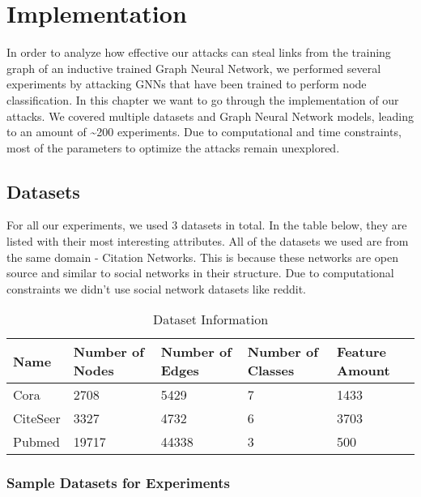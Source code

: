 \chapter{Implementation}

  In order to analyze how effective our attacks can steal links from the training graph of an inductive trained Graph Neural Network, we performed several experiments by attacking GNNs that have been trained to perform node classification.
  In this chapter we want to go through the implementation of our attacks.
  We covered multiple datasets and Graph Neural Network models, leading to an amount of \textasciitilde200 experiments.
  Due to computational and time constraints, most of the parameters to optimize the attacks remain unexplored.

  \section{Datasets}
  \label{section:datasets}

    For all our experiments, we used 3 datasets in total.
    In the table below, they are listed with their most interesting attributes.
    All of the datasets we used are from the same domain - Citation Networks.
    This is because these networks are open source and similar to social networks in their structure.
    Due to computational constraints we didn't use social network datasets like reddit.

    \vspace{0.48cm}
    \begin{table}[!h]
      \centering
      \footnotesize
      \begin{tabular}{l|l|l|l|l}
        \toprule
        Name & Number of Nodes & Number of Edges & Number of Classes & Feature Amount \\
        \midrule
        Cora & 2708            & 5429            & 7                 & 1433 \\
        CiteSeer & 3327        & 4732            & 6                 & 3703 \\
        Pubmed & 19717         & 44338           & 3                 & 500 \\
        \bottomrule
      \end{tabular}
      \caption{Dataset Information}
      \label{table:datasets}
    \end{table}

    \subsection*{Sample Datasets for Experiments}
    \label{subsection:dataset-samples}

